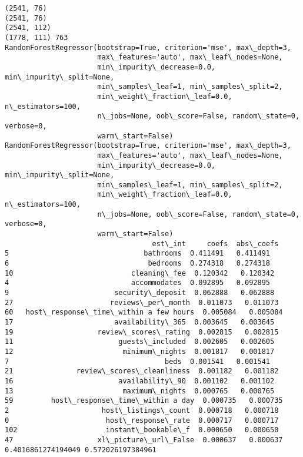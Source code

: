 \documentclass[11pt]{article}
\begin{document}
    \begin{Verbatim}[commandchars=\\\{\}]
(2541, 76)
(2541, 76)
(2541, 112)
(1778, 111) 763
RandomForestRegressor(bootstrap=True, criterion='mse', max\_depth=3,
                      max\_features='auto', max\_leaf\_nodes=None,
                      min\_impurity\_decrease=0.0, min\_impurity\_split=None,
                      min\_samples\_leaf=1, min\_samples\_split=2,
                      min\_weight\_fraction\_leaf=0.0, n\_estimators=100,
                      n\_jobs=None, oob\_score=False, random\_state=0, verbose=0,
                      warm\_start=False)
RandomForestRegressor(bootstrap=True, criterion='mse', max\_depth=3,
                      max\_features='auto', max\_leaf\_nodes=None,
                      min\_impurity\_decrease=0.0, min\_impurity\_split=None,
                      min\_samples\_leaf=1, min\_samples\_split=2,
                      min\_weight\_fraction\_leaf=0.0, n\_estimators=100,
                      n\_jobs=None, oob\_score=False, random\_state=0, verbose=0,
                      warm\_start=False)
                                   est\_int     coefs  abs\_coefs
5                                bathrooms  0.411491   0.411491
6                                 bedrooms  0.274318   0.274318
10                            cleaning\_fee  0.120342   0.120342
4                             accommodates  0.092895   0.092895
9                         security\_deposit  0.062888   0.062888
27                       reviews\_per\_month  0.011073   0.011073
60   host\_response\_time\_within a few hours  0.005084   0.005084
17                        availability\_365  0.003645   0.003645
19                    review\_scores\_rating  0.002815   0.002815
11                         guests\_included  0.002605   0.002605
12                          minimum\_nights  0.001817   0.001817
7                                     beds  0.001541   0.001541
21               review\_scores\_cleanliness  0.001182   0.001182
16                         availability\_90  0.001102   0.001102
13                          maximum\_nights  0.000765   0.000765
59         host\_response\_time\_within a day  0.000735   0.000735
2                      host\_listings\_count  0.000718   0.000718
0                       host\_response\_rate  0.000717   0.000717
102                     instant\_bookable\_f  0.000650   0.000650
47                    xl\_picture\_url\_False  0.000637   0.000637
0.4016861274194049 0.572026197384961

    \end{Verbatim}
\end{document}
